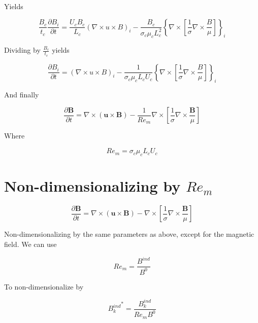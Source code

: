 \documentclass[11pt]{article}
\begin{document}
Yields

\begin{equation}
	\frac{B_c}{t_c} 
	\frac{\partial B_i}{\partial t} 
	= 
	\frac{U_c B_c}{L_c}
	(\nabla \times u \times B)_i
	- 
	\frac{B_c}{\sigma_c \mu_c L_c^2}
	\left\{
	\nabla \times 
	\left[ \frac{1}{\sigma}
	\nabla \times \frac{B}{\mu} \right]
	\right\}_i
\end{equation}

Dividing by $\frac{B_c}{t_c}$ yields

\begin{equation}
	\frac{\partial B_i}{\partial t} 
	= 
	(\nabla \times u \times B)_i
	- 
	\frac{1}{\sigma_c \mu_c L_c U_c}
	\left\{
	\nabla \times 
	\left[ \frac{1}{\sigma}
	\nabla \times \frac{B}{\mu} \right]
	\right\}_i
\end{equation}

And finally

\begin{equation}
	\boxed{
	\frac{\partial \pmb{B}}{\partial t} = 
	\nabla \times (\pmb{u} \times \pmb{B})
	- 
	\frac{1}{Re_m}
	\nabla \times 
	\left[ \frac{1}{\sigma}
	\nabla \times \frac{\pmb{B}}{\mu} \right]
	}
\end{equation}

Where

\begin{equation}
	Re_m = \sigma_c \mu_c L_c U_c
\end{equation}


\section{Non-dimensionalizing by \texorpdfstring{$Re_m$}{LG}}

\begin{equation}
	\frac{\partial \pmb{B}}{\partial t} = 
	\nabla \times (\pmb{u} \times \pmb{B})
	- \nabla \times 
	\left[ \frac{1}{\sigma}
	\nabla \times \frac{\pmb{B}}{\mu} \right]
\end{equation}

Non-dimensionalizing by the same parameters as above, except for the magnetic field. We can use


\begin{equation}
	Re_m = \frac{B^{ind}}{B^{0}}
\end{equation}

To non-dimensionalize by

\begin{equation*}
	{B_k^{ind}}^* = \frac{B_k^{ind}}{Re_m B^{0}}
\end{equation*}
\end{document}
